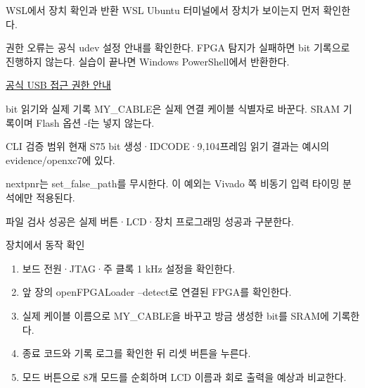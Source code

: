 \begin{frame}{WSL에서 장치 확인과 반환}
\small
WSL Ubuntu 터미널에서 장치가 보이는지 먼저 확인한다.\par{}권한 오류는 공식 udev 설정 안내를 확인한다. FPGA 탐지가 실패하면 bit 기록으로 진행하지 않는다. 실습이 끝나면 Windows PowerShell에서 반환한다.\par{}\href{https://trabucayre.github.io/openFPGALoader/guide/install.html\#udev-rules}{공식 USB 접근 권한 안내}
\end{frame}

\begin{frame}{bit 읽기와 실제 기록}
\small
{}MY\_CABLE은 실제 연결 케이블 식별자로 바꾼다. SRAM 기록이며 Flash 옵션 -f는 넣지 않는다.\par
\end{frame}

\begin{frame}{CLI 검증 범위}
\small
현재 S75 bit 생성·IDCODE·9,104프레임 읽기 결과는 예시의 evidence/openxc7에 있다.\par\vspace{0.26cm}nextpnr는 set\_false\_path를 무시한다. 이 예외는 Vivado 쪽 비동기 입력 타이밍 분석에만 적용된다.\par\vspace{0.26cm}파일 검사 성공은 실제 버튼·LCD·장치 프로그래밍 성공과 구분한다.\par
\end{frame}

\begin{frame}{장치에서 동작 확인}
\small
\begin{enumerate}
\item 보드 전원·JTAG·주 클록 1 kHz 설정을 확인한다.
\item 앞 장의 openFPGALoader --detect로 연결된 FPGA를 확인한다.
\item 실제 케이블 이름으로 MY\_CABLE을 바꾸고 방금 생성한 bit를 SRAM에 기록한다.
\item 종료 코드와 기록 로그를 확인한 뒤 리셋 버튼을 누른다.
\item 모드 버튼으로 8개 모드를 순회하며 LCD 이름과 회로 출력을 예상과 비교한다.
\end{enumerate}
\end{frame}

